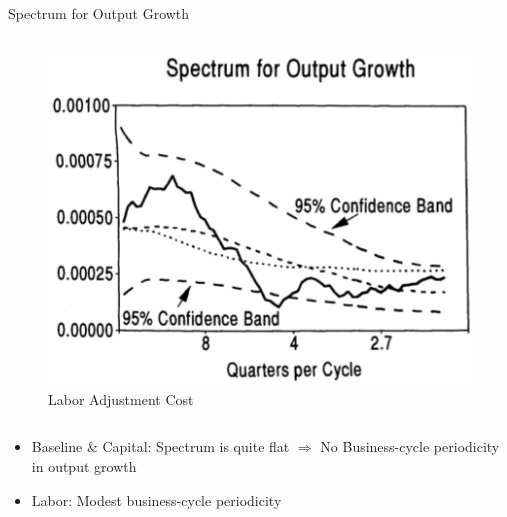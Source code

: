 \documentclass[10pt]{beamer}
\begin{document}
\begin{frame}{Spectrum for Output Growth}
\begin{columns}[T,onlytextwidth]
		      				\begin{figure}
		      					\centering
		      					\includegraphics[width=\linewidth]{figures/L_spect.png}
		      					\caption{Labor Adjustment Cost}
		      				\end{figure}
		      			\end{columns}
		      			
		      			\begin{itemize}
		      				\item Baseline \& Capital: Spectrum is quite flat $\Rightarrow$ No Business-cycle
		      				      periodicity in output growth
		      				\item Labor: Modest business-cycle periodicity
		      			\end{itemize}
		      			
		      		\end{frame}
		      		
\end{document}
